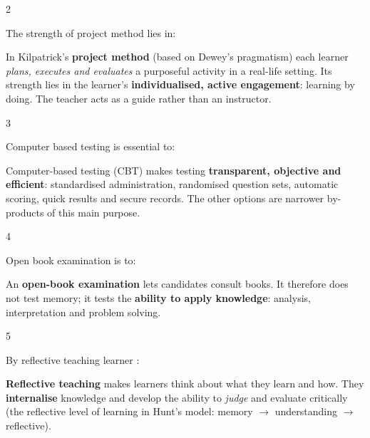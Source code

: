 \begin{question}{2}
{The strength of project method lies in:\par}
\begin{explain}
In Kilpatrick's \textbf{project method} (based on Dewey's pragmatism) each learner \emph{plans, executes and evaluates} a purposeful activity in a real-life setting. Its strength lies in the learner's \textbf{individualised, active engagement}: learning by doing. The teacher acts as a guide rather than an instructor.
\end{explain}
\end{question}

\begin{question}{3}
{Computer based testing is essential to:\par}
\begin{explain}
Computer-based testing (CBT) makes testing \textbf{transparent, objective and efficient}: standardised administration, randomised question sets, automatic scoring, quick results and secure records. The other options are narrower by-products of this main purpose.
\end{explain}
\end{question}

\begin{question}{4}
{Open book examination is to:\par}
\begin{explain}
An \textbf{open-book examination} lets candidates consult books. It therefore does not test memory; it tests the \textbf{ability to apply knowledge}: analysis, interpretation and problem solving.
\end{explain}
\end{question}

\begin{question}{5}
{By reflective teaching learner :\par}
\begin{explain}
\textbf{Reflective teaching} makes learners think about what they learn and how. They \textbf{internalise} knowledge and develop the ability to \emph{judge} and evaluate critically (the reflective level of learning in Hunt's model: memory $\rightarrow$ understanding $\rightarrow$ reflective).
\end{explain}
\end{question}

